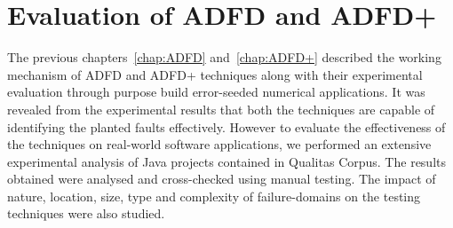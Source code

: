 
\chapter{Evaluation of ADFD and ADFD+}
\label{chap:Evaluation}
	

The previous chapters~\ref{chap:ADFD} and~\ref{chap:ADFD+} described the working mechanism of ADFD and ADFD+ techniques along with their experimental evaluation through purpose build error-seeded numerical applications. It was revealed from the experimental results that both the techniques are capable of identifying the planted faults effectively. However to evaluate the effectiveness of the techniques on real-world software applications, we performed an extensive experimental analysis of Java projects contained in Qualitas Corpus. The results obtained were analysed and cross-checked using manual testing. The impact of nature, location, size, type and complexity of failure-domains on the testing techniques were also studied. 




